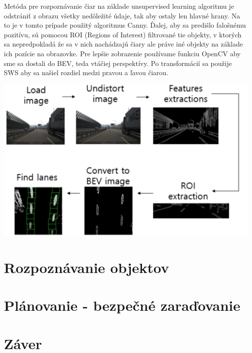 \documentclass[10pt,twoside,slovak,a4paper]{article}
\begin{document}
Metóda pre rozpoznávanie čiar na základe unsupervised learning algoritmu je odstrániť z obrazu všetky nedôležité údaje, tak aby ostaly len hlavné hrany. Na to je v tomto prípade použitý algoritmus Canny. Ďalej, aby sa predišlo falošnému pozitívu, sú pomocou ROI (Regions of Interest) filtrované tie objekty, v ktorých sa nepredpokladá že sa v nich nachádzajú čiary ale práve iné objekty na základe ich pozície na obrazovke. Pre lepšie zobrazenie používame funkciu OpenCV aby sme sa dostali do BEV, teda vtáčiej perspektívy. Po transformácií sa použije SWS aby sa našiel rozdiel medzi pravou a ľavou čiarou. 

\includegraphics{find_lanes2}





\cite {KSII}
\cite {9179748}
\cite{tiis:22283}
\cite{tiis:23914}


\section{Rozpoznávanie objektov}


\cite {9337402}
\cite {9253253}

\section{Plánovanie - bezpečné zaraďovanie}


\cite {9034121}

\section{Záver}



\end{document}

